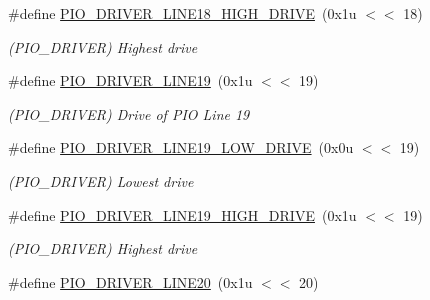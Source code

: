\begin{DoxyCompactItemize}
\mbox{\label{group__SAMS70__PIO_ga2304d44f8d5343097394ee85aa38f62e}} 
\#define \mbox{\hyperlink{group__SAMS70__PIO_ga2304d44f8d5343097394ee85aa38f62e}{P\+I\+O\+\_\+\+D\+R\+I\+V\+E\+R\+\_\+\+L\+I\+N\+E18\+\_\+\+H\+I\+G\+H\+\_\+\+D\+R\+I\+VE}}~(0x1u $<$$<$ 18)
\begin{DoxyCompactList}\small\item\em (P\+I\+O\+\_\+\+D\+R\+I\+V\+ER) Highest drive \end{DoxyCompactList}\item 
\mbox{\label{group__SAMS70__PIO_ga8ea454bc8ccef506848f248863b2043f}} 
\#define \mbox{\hyperlink{group__SAMS70__PIO_ga8ea454bc8ccef506848f248863b2043f}{P\+I\+O\+\_\+\+D\+R\+I\+V\+E\+R\+\_\+\+L\+I\+N\+E19}}~(0x1u $<$$<$ 19)
\begin{DoxyCompactList}\small\item\em (P\+I\+O\+\_\+\+D\+R\+I\+V\+ER) Drive of P\+IO Line 19 \end{DoxyCompactList}\item 
\mbox{\label{group__SAMS70__PIO_ga9ccf13eb1f24774ba50fe95f8957378b}} 
\#define \mbox{\hyperlink{group__SAMS70__PIO_ga9ccf13eb1f24774ba50fe95f8957378b}{P\+I\+O\+\_\+\+D\+R\+I\+V\+E\+R\+\_\+\+L\+I\+N\+E19\+\_\+\+L\+O\+W\+\_\+\+D\+R\+I\+VE}}~(0x0u $<$$<$ 19)
\begin{DoxyCompactList}\small\item\em (P\+I\+O\+\_\+\+D\+R\+I\+V\+ER) Lowest drive \end{DoxyCompactList}\item 
\mbox{\label{group__SAMS70__PIO_gaf8a905aa93d4aac65d77c28dc690f58b}} 
\#define \mbox{\hyperlink{group__SAMS70__PIO_gaf8a905aa93d4aac65d77c28dc690f58b}{P\+I\+O\+\_\+\+D\+R\+I\+V\+E\+R\+\_\+\+L\+I\+N\+E19\+\_\+\+H\+I\+G\+H\+\_\+\+D\+R\+I\+VE}}~(0x1u $<$$<$ 19)
\begin{DoxyCompactList}\small\item\em (P\+I\+O\+\_\+\+D\+R\+I\+V\+ER) Highest drive \end{DoxyCompactList}\item 
\mbox{\label{group__SAMS70__PIO_ga9508975d98d9cbcc937f20b69c6789ee}} 
\#define \mbox{\hyperlink{group__SAMS70__PIO_ga9508975d98d9cbcc937f20b69c6789ee}{P\+I\+O\+\_\+\+D\+R\+I\+V\+E\+R\+\_\+\+L\+I\+N\+E20}}~(0x1u $<$$<$ 20)
$$
\end{DoxyCompactItemize}
